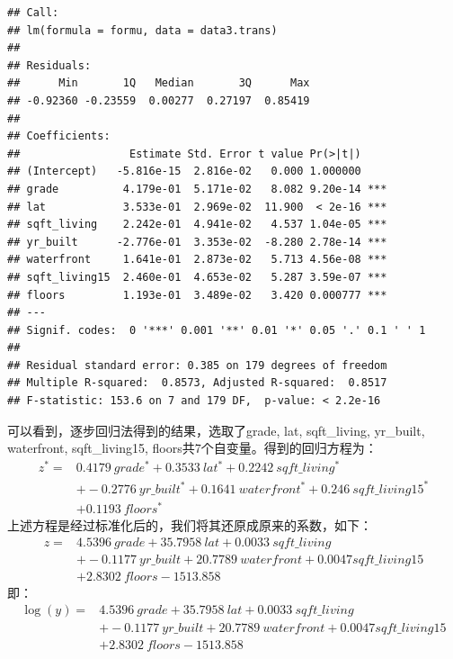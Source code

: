 \documentclass[]{article}
\begin{document}
\begin{verbatim}
## Call:
## lm(formula = formu, data = data3.trans)
## 
## Residuals:
##      Min       1Q   Median       3Q      Max 
## -0.92360 -0.23559  0.00277  0.27197  0.85419 
## 
## Coefficients:
##                 Estimate Std. Error t value Pr(>|t|)    
## (Intercept)   -5.816e-15  2.816e-02   0.000 1.000000    
## grade          4.179e-01  5.171e-02   8.082 9.20e-14 ***
## lat            3.533e-01  2.969e-02  11.900  < 2e-16 ***
## sqft_living    2.242e-01  4.941e-02   4.537 1.04e-05 ***
## yr_built      -2.776e-01  3.353e-02  -8.280 2.78e-14 ***
## waterfront     1.641e-01  2.873e-02   5.713 4.56e-08 ***
## sqft_living15  2.460e-01  4.653e-02   5.287 3.59e-07 ***
## floors         1.193e-01  3.489e-02   3.420 0.000777 ***
## ---
## Signif. codes:  0 '***' 0.001 '**' 0.01 '*' 0.05 '.' 0.1 ' ' 1
## 
## Residual standard error: 0.385 on 179 degrees of freedom
## Multiple R-squared:  0.8573, Adjusted R-squared:  0.8517 
## F-statistic: 153.6 on 7 and 179 DF,  p-value: < 2.2e-16
\end{verbatim}

可以看到，逐步回归法得到的结果，选取了grade, lat, sqft\_living,
yr\_built, waterfront, sqft\_living15,
floors共7个自变量。得到的回归方程为：
\begin{align*}
z^* = & 0.4179\ grade^* + 0.3533\ lat^* + 0.2242\ sqft\_living ^* \\
& + -0.2776\ yr\_built^* + 0.1641\ waterfront^* + 0.246\ sqft\_living15^* \\
& + 0.1193\ floors^*
\end{align*}
上述方程是经过标准化后的，我们将其还原成原来的系数，如下：
\begin{align*}
z = & 4.5396\ grade + 35.7958\ lat + 0.0033\ sqft\_living \\
& + -0.1177\ yr\_built + 20.7789\ waterfront + 0.0047 sqft\_living15 \\
& + 2.8302\ floors -1513.858
\end{align*}
即：
\begin{align*}
\log{(y)} = & 4.5396\ grade + 35.7958\ lat + 0.0033\ sqft\_living \\
& + -0.1177\ yr\_built + 20.7789\ waterfront + 0.0047 sqft\_living15 \\
& + 2.8302\ floors -1513.858
\end{align*}






%
\end{document}

